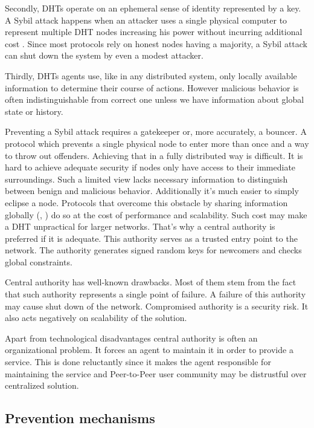   Secondly, DHTs operate on an ephemeral sense of identity represented by a key.
  A Sybil attack happens when an attacker uses a single physical computer to
  represent multiple DHT nodes increasing his power without incurring additional
  cost \cite{dou02}. Since most protocols rely on honest nodes having a
  majority, a Sybil attack can shut down the system by even a modest attacker.

  Thirdly, DHTs agents use, like in any distributed system, only locally
  available information to determine their course of actions. However malicious
  behavior is often indistinguishable from correct one unless we have
  information about global state or history.

  Preventing a Sybil attack requires a gatekeeper or, more accurately, a
  bouncer. A protocol which prevents a single physical node to enter more than
  once and a way to throw out offenders. Achieving that in a fully distributed
  way is difficult. It is hard to achieve adequate security if nodes only have
  access to their immediate surroundings.  Such a limited view lacks necessary
  information to distinguish between benign and malicious behavior.
  Additionally it's much easier to simply eclipse a node. Protocols that
  overcome this obstacle by sharing information globally (\cite{cas02},
  \cite{wan05}) do so at the cost of performance and scalability. Such cost
  may make a DHT unpractical for larger networks. That's why a central authority
  is preferred if it is adequate. This authority serves as a trusted entry point
  to the network. The authority generates signed random keys for newcomers and
  checks global constraints.

  Central authority has well-known drawbacks. Most of them stem from the fact
  that such authority represents a single point of failure. A failure of this
  authority may cause shut down of the network. Compromised authority is a
  security risk. It also acts negatively on scalability of the solution.
  
  Apart from technological disadvantages central authority is often an
  organizational problem. It forces an agent to maintain it in order to provide
  a service. This is done reluctantly since it makes the agent responsible for
  maintaining the service and Peer-to-Peer user community may be distrustful
  over centralized solution.

\subsection{Prevention mechanisms}


